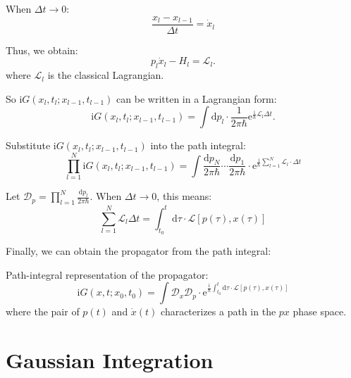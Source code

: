 When $\Delta t \to 0$:
\begin{equation}
\frac{x_l - x_{l-1}}{\Delta t} = \dot{x}_l
\end{equation}

Thus, we obtain:
\begin{equation}
p_l\dot{x}_l - H_l = \mathcal{L}_l.
\end{equation}
where $\mathcal{L}_l$ is the classical Lagrangian.

So $\mathrm{i}G(x_l, t_l; x_{l-1}, t_{l-1})$ can be written in a Lagrangian form:
\begin{equation}
\mathrm{i}G(x_l, t_l; x_{l-1}, t_{l-1}) = \int \mathrm{d}p_l \cdot \frac{1}{2\pi\hbar} \mathrm{e}^{\frac{\mathrm{i}}{\hbar}\mathcal{L}_l\Delta t}.
\end{equation}

Substitute $\mathrm{i}G(x_l, t_l; x_{l-1}, t_{l-1})$ into the path integral:
\begin{equation}
\prod_{l=1}^{N} \mathrm{i}G(x_l, t_l; x_{l-1}, t_{l-1}) = \int \frac{\mathrm{d}p_N}{2\pi\hbar} \cdots \frac{\mathrm{d}p_1}{2\pi\hbar} \cdot \mathrm{e}^{\frac{\mathrm{i}}{\hbar}\sum_{l=1}^{N}\mathcal{L}_l \cdot \Delta t}
\end{equation}

Let $\mathcal{D}_p = \prod_{l=1}^{N} \frac{\mathrm{d}p_l}{2\pi\hbar}$. When $\Delta t \to 0$, this means:
\begin{equation}
\sum_{l=1}^{N} \mathcal{L}_l \Delta t = \int_{t_0}^{t} \mathrm{d}\tau \cdot \mathcal{L}[p(\tau), x(\tau)]
\end{equation}

Finally, we can obtain the propagator from the path integral:
\begin{theorem}
    Path-integral representation of the propagator:
    \begin{equation}
        \mathrm{i}G(x, t; x_0, t_0) 
        = \int \mathcal{D}_x \mathcal{D}_p \cdot \mathrm{e}^{\frac{\mathrm{i}}{\hbar}\int_{t_0}^{t} \mathrm{d}\tau \cdot \mathcal{L}[p(\tau), x(\tau)]}
    \end{equation}
    where the pair of $p(t)$ and $\dot{x}(t)$ characterizes a path in the $px$ phase space.
\end{theorem}

\begin{center}

\end{center}

\section{Gaussian Integration}

